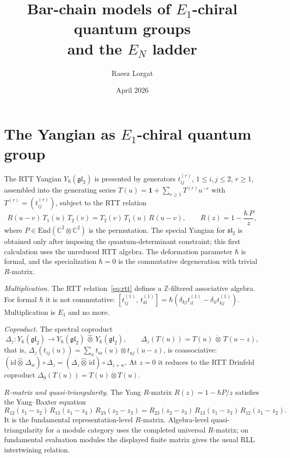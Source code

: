 \documentclass[11pt]{article}
\title{Bar-chain models of $E_1$-chiral quantum groups\\
and the $E_N$ ladder}
\author{Raeez Lorgat}
\date{April 2026}
\theoremstyle{remark}
\providecommand{\End}{\mathrm{End}}
\providecommand{\id}{\mathrm{id}}
\providecommand{\bC}{\mathbb{C}}
\providecommand{\bZ}{\mathbb{Z}}
\providecommand{\fgl}{\mathfrak{gl}}
\providecommand{\fsl}{\mathfrak{sl}}
\begin{document}
\maketitle

\section{The Yangian as $E_1$-chiral quantum group}
\label{sec:yangian}

The RTT Yangian $Y_\hbar(\fgl_2)$ is presented by generators
$t^{(r)}_{ij}$, $1 \le i,j \le 2$, $r \ge 1$, assembled into the
generating series $T(u) = \mathbf{1} + \sum_{r \ge 1} T^{(r)} u^{-r}$
with $T^{(r)} = (t^{(r)}_{ij})$, subject to the RTT relation
\begin{equation}\label{eq:rtt}
R(u-v)\, T_1(u)\, T_2(v) = T_2(v)\, T_1(u)\, R(u-v),
\qquad
R(z) = 1 - \frac{\hbar\, P}{z},
\end{equation}
where $P \in \End(\bC^2 \otimes \bC^2)$ is the permutation.
The special Yangian for $\fsl_2$ is obtained only after imposing the
quantum-determinant constraint; this first calculation uses the
unreduced RTT algebra.  The deformation parameter $\hbar$ is formal, and
the specialization $\hbar=0$ is the commutative degeneration with
trivial $R$-matrix.

\smallskip
\noindent\textit{Multiplication.}
The RTT relation~\eqref{eq:rtt} defines a $\bZ$-filtered associative
algebra.  For formal $\hbar$ it is not commutative:
$[t^{(1)}_{ij},\, t^{(1)}_{kl}]
= \hbar(\delta_{kj} t^{(1)}_{il} - \delta_{il} t^{(1)}_{kj})$.
Multiplication is $E_1$ and no more.

\smallskip
\noindent\textit{Coproduct.}
The spectral coproduct
\begin{equation}\label{eq:coproduct}
\Delta_z \colon Y_\hbar(\fgl_2) \to
Y_\hbar(\fgl_2) \,\widehat{\otimes}\, Y_\hbar(\fgl_2),
\qquad
\Delta_z(T(u)) = T(u) \,\dot\otimes\, T(u-z),
\end{equation}
that is,
$\Delta_z(t_{ij}(u)) =
\sum_a t_{ia}(u) \otimes t_{aj}(u-z)$,
is coassociative: $(\id \widehat{\otimes}\, \Delta_w) \circ \Delta_z
= (\Delta_z \widehat{\otimes}\, \id) \circ \Delta_{z+w}$.  At $z=0$
it reduces to the RTT Drinfeld coproduct
$\Delta_0(T(u)) = T(u) \dot\otimes T(u)$.

\smallskip
\noindent\textit{$R$-matrix and quasi-triangularity.}
The Yang $R$-matrix $R(z) = 1 - \hbar P/z$ satisfies the Yang--Baxter equation
\begin{equation}\label{eq:ybe}
R_{12}(z_1 - z_2)\, R_{13}(z_1 - z_3)\, R_{23}(z_2 - z_3)
= R_{23}(z_2 - z_3)\, R_{13}(z_1 - z_3)\, R_{12}(z_1 - z_2).
\end{equation}
It is the fundamental representation-level $R$-matrix.  Algebra-level
quasi-triangularity for a module category uses the completed universal
$R$-matrix; on fundamental evaluation modules the displayed finite
matrix gives the usual RLL intertwining relation.
\end{document}
